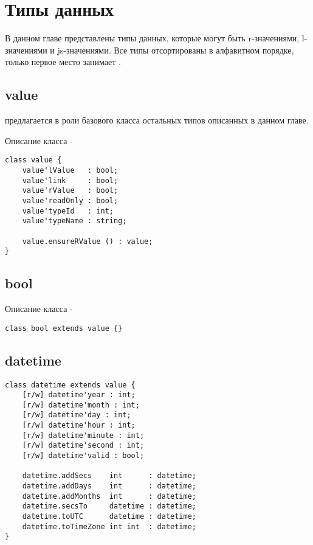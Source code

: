 

\section{Типы данных}

В данном главе представлены типы данных, которые могут быть r-значениями, l-значениями и js-значениями. Все типы отсортированы в алфавитном порядке, только первое место занимает .

\subsection{{\color{lightblue} value}}

 предлагается в роли базового класса остальных типов описанных в данном главе.

\noindent Описание класса  -
\begin{lstlisting}[numbers=none]
class value {
    value'lValue   : bool;
    value'link     : bool;
    value'rValue   : bool;
    value'readOnly : bool;
    value'typeId   : int;
    value'typeName : string;

    value.ensureRValue () : value;
}
\end{lstlisting}

\subsection{{\color{lightblue} bool}}

\noindent Описание класса \bool -
\begin{lstlisting}[numbers=none]
class bool extends value {}
\end{lstlisting}

\subsection{{\color{lightblue} datetime}}

\begin{lstlisting}[numbers=none]
class datetime extends value {
	[r/w] datetime'year : int;
	[r/w] datetime'month : int;
	[r/w] datetime'day : int;
	[r/w] datetime'hour : int;
	[r/w] datetime'minute : int;
	[r/w] datetime'second : int;
	[r/w] datetime'valid : bool;
	
	datetime.addSecs    int      : datetime;
	datetime.addDays    int      : datetime;
	datetime.addMonths  int      : datetime;
	datetime.secsTo     datetime : datetime;
	datetime.toUTC      datetime : datetime;
	datetime.toTimeZone int int  : datetime;
}
\end{lstlisting}

